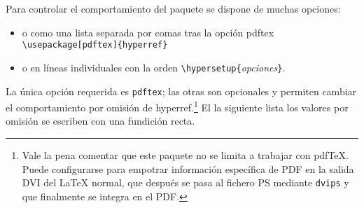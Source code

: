 Para controlar el comportamiento del paquete
 se dispone de muchas opciones:
\begin{itemize}
\item o como una lista separada por comas tras la opción pdftex\\
  \verb+\usepackage[pdftex]{hyperref}+
\item o en líneas individuales con la orden
  \verb+\hypersetup{+\emph{opciones}\verb+}+.
\end{itemize}

La única opción requerida es \texttt{pdftex}; las otras son opcionales
y permiten cambiar el comportamiento por omisión de
hyperref.\footnote{Vale la pena comentar que este paquete no
 se limita a trabajar con  pdf\TeX{}.  Puede configurarse para
 empotrar información específica de PDF en la salida DVI del  \LaTeX{}
 normal, que después se pasa al fichero PS mediante \texttt{dvips} y
 que finalmente se integra en el  PDF.}  El la siguiente lista los
valores por omisión se escriben con una fundición recta.

